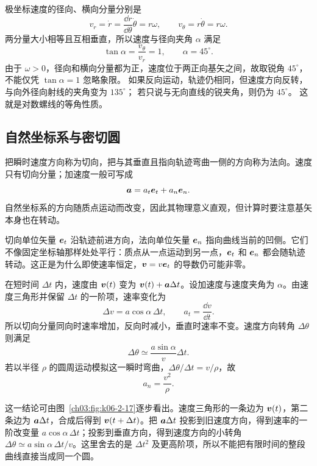 {\begin{xesolution}
极坐标速度的径向、横向分量分别是
\[
v_r=\dot r=\frac{\dd r}{\dd\theta}\dot\theta=r\omega,
\qquad
v_\theta=r\dot\theta=r\omega.
\]
两分量大小相等且互相垂直，所以速度与径向夹角 $\alpha$ 满足
\[
 \tan\alpha=\frac{v_\theta}{v_r}=1,
 \qquad \boxed{\alpha=45^\circ}.
\]
由于 $\omega>0$，径向和横向分量都为正，速度位于两正向基矢之间，故取锐角 $45^\circ$，不能仅凭 $\tan\alpha=1$ 忽略象限。
如果反向运动，轨迹仍相同，但速度方向反转，与向外径向射线的夹角变为 $135^\circ$；
若只说与无向直线的锐夹角，则仍为 $45^\circ$。
这就是对数螺线的等角性质。
\end{xesolution}

\subsection{自然坐标系与密切圆}

\NaturalCoordinatesDiagram

把瞬时速度方向称为切向，把与其垂直且指向轨迹弯曲一侧的方向称为法向。速度只有切向分量；加速度一般可写成
\[
\bm{a}=a_t\bm{e}_t+a_n\bm{e}_n.
\]
自然坐标系的方向随质点运动而改变，因此其物理意义直观，但计算时要注意基矢本身也在转动。

切向单位矢量 $\bm{e}_t$ 沿轨迹前进方向，法向单位矢量 $\bm{e}_n$ 指向曲线当前的凹侧。它们不像固定坐标轴那样处处平行：质点从一点运动到另一点，$\bm{e}_t$ 和 $\bm{e}_n$ 都会随轨迹转动。这正是为什么即使速率恒定，$\bm{v}=v\bm{e}_t$ 的导数仍可能非零。

在短时间 $\Delta t$ 内，速度由 $\bm{v}(t)$ 变为 $\bm{v}(t)+\bm{a}\Delta t$。设加速度与速度夹角为 $\alpha$。由速度三角形并保留 $\Delta t$ 的一阶项，速率变化为
\begin{equation}
 \Delta v=a\cos\alpha\,\Delta t,
 \qquad \boxed{a_t=\frac{\dd v}{\dd t}}.
\end{equation}
所以切向分量同向时速率增加，反向时减小，垂直时速率不变。速度方向转角 $\Delta\theta$ 则满足
\begin{equation}
 \Delta\theta\simeq\frac{a\sin\alpha}{v}\Delta t.
\end{equation}
若以半径 $\rho$ 的圆周运动模拟这一瞬时弯曲，$\Delta\theta/\Delta t=v/\rho$，故
\begin{equation}
 \boxed{a_n=\frac{v^2}{\rho}}.
\end{equation}

\VelocityIncrementNaturalDiagram

这一结论可由图~\ref{ch03:fig:k06-2-17}逐步看出。速度三角形的一条边为 $\bm{v}(t)$，第二条边为 $\bm{a}\Delta t$，合成后得到 $\bm{v}(t+\Delta t)$。把 $\bm{a}\Delta t$ 投影到旧速度方向，得到速率的一阶改变量 $a\cos\alpha\,\Delta t$；投影到垂直方向，得到速度方向的小转角 $\Delta\theta\simeq a\sin\alpha\,\Delta t/v$。这里舍去的是 $\Delta t^2$ 及更高阶项，所以不能把有限时间的整段曲线直接当成同一个圆。

}
